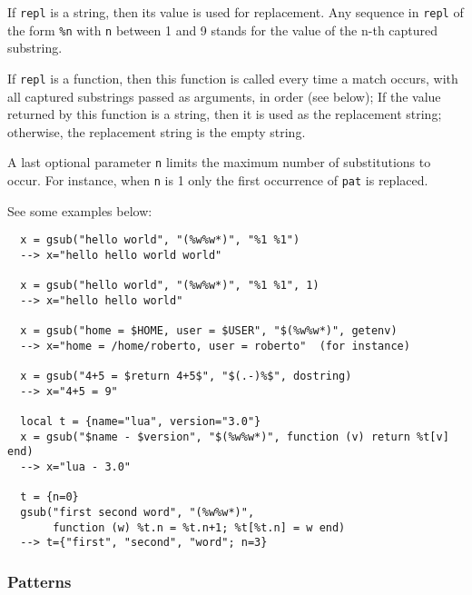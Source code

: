 If \verb|repl| is a string, then its value is used for replacement.
Any sequence in \verb|repl| of the form \verb|%n|
with \verb|n| between 1 and 9
stands for the value of the n-th captured substring.

If \verb|repl| is a function, then this function is called every time a
match occurs, with all captured substrings passed as arguments,
in order (see below);
If the value returned by this function is a string,
then it is used as the replacement string;
otherwise, the replacement string is the empty string.

A last optional parameter \verb|n| limits
the maximum number of substitutions to occur.
For instance, when \verb|n| is 1 only the first occurrence of
\verb|pat| is replaced.

See some examples below:
\begin{verbatim}
  x = gsub("hello world", "(%w%w*)", "%1 %1")
  --> x="hello hello world world"

  x = gsub("hello world", "(%w%w*)", "%1 %1", 1)
  --> x="hello hello world"

  x = gsub("home = $HOME, user = $USER", "$(%w%w*)", getenv)
  --> x="home = /home/roberto, user = roberto"  (for instance)

  x = gsub("4+5 = $return 4+5$", "$(.-)%$", dostring)
  --> x="4+5 = 9"

  local t = {name="lua", version="3.0"}
  x = gsub("$name - $version", "$(%w%w*)", function (v) return %t[v] end)
  --> x="lua - 3.0"

  t = {n=0}
  gsub("first second word", "(%w%w*)",
       function (w) %t.n = %t.n+1; %t[%t.n] = w end)
  --> t={"first", "second", "word"; n=3}
\end{verbatim}


\subsubsection*{Patterns} \label{pm}

